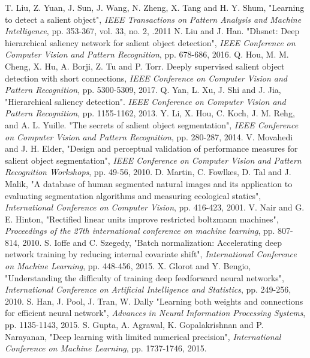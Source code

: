 \documentclass[a4paper,conference]{IEEEtran}
\begin{document}
\begin{thebibliography}{1}
T. Liu, Z. Yuan, J. Sun, J. Wang, N. Zheng, X. Tang and H. Y. Shum, "Learning to detect a salient object",  \emph{IEEE Transactions on Pattern Analysis and Machine Intelligence}, pp. 353-367, vol. 33, no. 2, .2011
N. Liu and J. Han. "Dhsnet: Deep hierarchical saliency network for salient object detection", \emph{IEEE Conference on Computer Vision and Pattern Recognition}, pp. 678-686, 2016.
Q. Hou, M. M. Cheng, X. Hu, A. Borji, Z. Tu and P. Torr. Deeply supervised salient object detection with short connections, \emph{IEEE Conference on Computer Vision and Pattern Recognition}, pp. 5300-5309, 2017.
Q. Yan, L. Xu, J. Shi and J. Jia, "Hierarchical saliency detection". \emph{IEEE Conference on Computer Vision and Pattern Recognition}, pp. 1155-1162, 2013.
Y. Li, X. Hou, C. Koch, J. M. Rehg, and A. L. Yuille. "The secrets of salient object segmentation", \emph{IEEE Conference on Computer Vision and Pattern Recognition}, pp. 280-287, 2014.
V. Movahedi and J. H. Elder, "Design and perceptual validation of performance measures for salient object segmentation", \emph{IEEE Conference on Computer Vision and Pattern Recognition Workshops}, pp. 49-56, 2010.
D. Martin, C. Fowlkes, D. Tal and J. Malik, "A database of human segmented natural images and its application to evaluating segmentation algorithms and measuring ecological statics", \emph{International Conference on Computer Vision}, pp. 416-423, 2001.
V. Nair and G. E. Hinton, "Rectified linear units improve restricted boltzmann machines", \emph{Proceedings of the 27th international conference on machine learning}, pp. 807-814, 2010.
S. Ioffe and C. Szegedy, "Batch normalization: Accelerating deep network training by reducing internal covariate shift", \emph{International Conference on Machine Learning}, pp. 448-456, 2015.
X. Glorot and Y. Bengio, "Understanding the difficulty of training deep feedforward neural networks", \emph{International Conference on Artificial Intelligence and Statistics}, pp. 249-256, 2010.
S. Han, J. Pool, J. Tran, W. Dally "Learning both weights and connections for efficient neural network",  \emph{Advances in Neural Information Processing Systems}, pp. 1135-1143, 2015.
S. Gupta, A. Agrawal, K. Gopalakrishnan and P. Narayanan, "Deep learning with limited numerical precision", \emph{International Conference on Machine Learning}, pp. 1737-1746, 2015.

\end{thebibliography}
\end{document}
